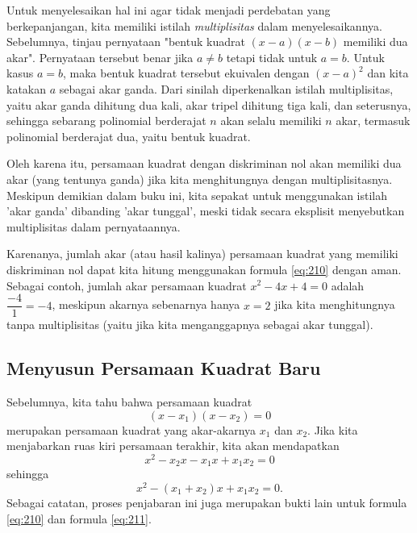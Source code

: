 	\par Untuk menyelesaikan hal ini agar tidak menjadi perdebatan yang berkepanjangan, kita memiliki istilah \textit{multiplisitas} dalam menyelesaikannya. Sebelumnya, tinjau pernyataan "bentuk kuadrat $ \left(x - a\right)\left(x - b\right) $ memiliki dua akar". Pernyataan tersebut benar jika $ a \ne b $ tetapi tidak untuk $ a = b $. Untuk kasus $ a = b $, maka bentuk kuadrat tersebut ekuivalen dengan $ \left(x - a\right)^{2} $ dan kita katakan $ a $ sebagai akar ganda. Dari sinilah diperkenalkan istilah multiplisitas, yaitu akar ganda dihitung dua kali, akar tripel dihitung tiga kali, dan seterusnya, sehingga sebarang polinomial berderajat $ n $ akan selalu memiliki $ n $ akar, termasuk polinomial berderajat dua, yaitu bentuk kuadrat.
	
	\par Oleh karena itu, persamaan kuadrat dengan diskriminan nol akan memiliki dua akar (yang tentunya ganda) jika kita menghitungnya dengan multiplisitasnya. Meskipun demikian dalam buku ini, kita sepakat untuk menggunakan istilah 'akar ganda' dibanding 'akar tunggal', meski tidak secara eksplisit menyebutkan multiplisitas dalam pernyataannya.
	
	\par Karenanya, jumlah akar (atau hasil kalinya) persamaan kuadrat yang memiliki diskriminan nol dapat kita hitung menggunakan formula \ref{eq:210} dengan aman. Sebagai contoh, jumlah akar persamaan kuadrat $ x^{2} - 4x + 4 = 0 $ adalah $ \dfrac{-4}{1} = -4 $, meskipun akarnya sebenarnya hanya $ x = 2 $ jika kita menghitungnya tanpa multiplisitas (yaitu jika kita menganggapnya sebagai akar tunggal).

\subsection{Menyusun Persamaan Kuadrat Baru}
	
	Sebelumnya, kita tahu bahwa persamaan kuadrat
	\[ \left(x - x_{1}\right)\left(x - x_{2}\right) = 0 \]
	merupakan persamaan kuadrat yang akar-akarnya $ x_{1} $ dan $ x_{2} $. Jika kita menjabarkan ruas kiri persamaan terakhir, kita akan mendapatkan
	\[ x^{2} - x_{2}x - x_{1}x + x_{1}x_{2} = 0 \]
	sehingga
	\begin{equation} \label{eq:221}
		x^{2} - \left(x_{1} + x_{2}\right)x + x_{1}x_{2} = 0.
	\end{equation}
	Sebagai catatan, proses penjabaran ini juga merupakan bukti lain untuk formula \ref{eq:210} dan formula \ref{eq:211}.
	
